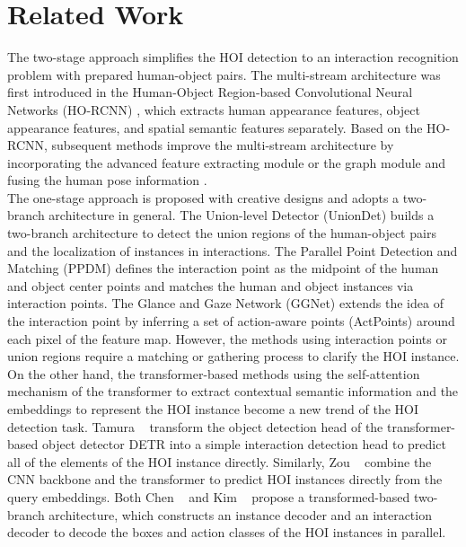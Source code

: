 \documentclass[10pt,twocolumn,letterpaper]{article}
\begin{document}
\section{Related Work}
\space The two-stage approach simplifies the HOI detection to an interaction recognition problem with prepared human-object pairs.
The multi-stream architecture was first introduced in the Human-Object Region-based Convolutional Neural Networks (HO-RCNN) \cite{chao2018learning}, which extracts human appearance features, object appearance features, and spatial semantic features separately.
Based on the HO-RCNN, subsequent methods improve the multi-stream architecture by incorporating the advanced feature extracting module \cite{gao2018ican} or the graph module \cite{zhou2019relation, ulutan2020vsgnet, gao2020drg, zhang2020spatio} and fusing the human pose information \cite{li2019transferable, zhong2021polysemy, gupta2019no}.
\\
\space The one-stage approach is proposed with creative designs and adopts a two-branch architecture in general.
The Union-level Detector (UnionDet) \cite{kim2020uniondet} builds a two-branch architecture to detect the union regions of the human-object pairs and the localization of instances in interactions.
The Parallel Point Detection and Matching (PPDM) \cite{liao2020ppdm} defines the interaction point as the midpoint of the human and object center points and matches the human and object instances via interaction points.
The Glance and Gaze Network (GGNet) \cite{zhong2021glance} extends the idea of the interaction point by inferring a set of action-aware points (ActPoints) around each pixel of the feature map.
However, the methods using interaction points \cite{liao2020ppdm,zhong2021glance,wang2020learning} or union regions \cite{kim2020uniondet} require a matching or gathering process to clarify the HOI instance.
On the other hand, the transformer-based methods \cite{kim2021hotr,zou2021end,chen2021reformulating,tamura2021qpic} using the self-attention mechanism of the transformer to extract contextual semantic information and the embeddings to represent the HOI instance become a new trend of the HOI detection task.
Tamura \etal~\cite{tamura2021qpic} transform the object detection head of the transformer-based object detector DETR \cite{carion2020end} into a simple interaction detection head to predict all of the elements of the HOI instance directly.
Similarly, Zou \etal~\cite{zou2021end} combine the CNN backbone and the transformer to predict HOI instances directly from the query embeddings.
Both Chen \etal~\cite{chen2021reformulating} and Kim \etal~\cite{kim2021hotr} propose a transformed-based two-branch architecture, which constructs an instance decoder and an interaction decoder to decode the boxes and action classes of the HOI instances in parallel.
\end{document}
